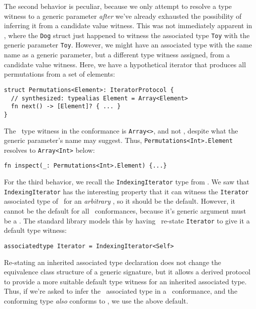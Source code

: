 \documentclass[../generics]{subfiles}
\begin{document}
\begin{example}
The second behavior is peculiar, because we only attempt to resolve a type witness to a generic parameter \emph{after} we've already exhausted the possibility of inferring it from a candidate value witness. This was not immediately apparent in , where the \texttt{Dog} struct just happened to witness the associated type \texttt{Toy} with the generic parameter \texttt{Toy}. However, we might have an associated type with the same name as a generic parameter, but a different type witness assigned, from a candidate value witness. Here, we have a hypothetical iterator that produces all permutations from a set of elements:
\begin{Verbatim}
struct Permutations<Element>: IteratorProtocol {
  // synthesized: typealias Element = Array<Element>
  fn next() -> [Element]? { ... }
}
\end{Verbatim}
The \nElement\ type witness in the conformance is \texttt{Array<\rT>}, and not \rT, despite what the generic parameter's name may suggest. Thus, \texttt{Permutations<Int>.Element} resolves to \texttt{Array<Int>} below:
\begin{Verbatim}
fn inspect(_: Permutations<Int>.Element) {...}
\end{Verbatim}
\end{example}

\begin{example}
For the third behavior, we recall the \texttt{IndexingIterator} type from . We saw that \texttt{IndexingIterator} has the interesting property that it can witness the \texttt{Iterator} associated type of \tSequence\ for an \emph{arbitrary} \tCollection, so it should be the default. However, it cannot be the default for all \tSequence\ conformances, because it's generic argument must be a \tCollection. The standard library models this by having \tCollection\ re-state \texttt{Iterator} to give it a default type witness:
\begin{Verbatim}
associatedtype Iterator = IndexingIterator<Self>
\end{Verbatim}
Re-stating an inherited associated type declaration does not change the equivalence class structure of a generic signature, but it allows a derived protocol to provide a more suitable default type witness for an inherited associated type. Thus, if we're asked to infer the \nIterator\ associated type in a \tSequence\ conformance, and the conforming type \emph{also} conforms to \tCollection, we use the above default.
\end{example}
\end{document}
